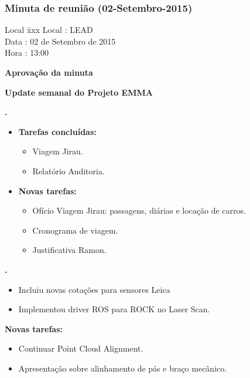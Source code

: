 \subsubsection{Minuta de reunião (02-Setembro-2015)}

\begin{tabbing}
  Local \= xxx \kill
  Local \> : LEAD \\
  Data  \> : 02 de Setembro de 2015 \\
  Hora  \> : 13:00
\end{tabbing}


\textbf{Aprovação da minuta}

\textbf{Update semanal do Projeto EMMA}
   							
\textbf{\alana.} 
	\begin{itemize}
		\item \textbf{Tarefas concluídas:}
			\begin{itemize}    
				\item Viagem Jirau.
				\item Relatório Auditoria.
			\end{itemize}
		
		\item \textbf{Novas tarefas:}
			\begin{itemize} 
				\item Ofício Viagem Jirau: passagens, diárias e locação de carros.
				\item Cronograma de viagem.
				\item Justificativa Ramon.
			\end{itemize}
	\end{itemize}   		
						
\textbf{\gabriel.} 
	\begin{itemize}
			\item Incluiu novas cotações para sensores Leica
			\item Implementou driver ROS para ROCK no Laser Scan.
			\end{itemize}
		
		\item \textbf{Novas tarefas:}
			\begin{itemize} 
				\item Continuar Point Cloud Alignment.
				\item Apresentação sobre alinhamento de pás e braço mecânico.
			\end{itemize}

